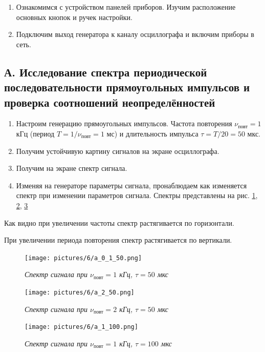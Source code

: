 \documentclass[a4paper,12pt]{article}
\begin{document}
\begin{enumerate}
    \item Ознакомимся с устройством панелей приборов. Изучим расположение основных кнопок и ручек настройки.
    \item Подключим выход генератора к каналу осциллографа и включим приборы в сеть.
\end{enumerate}

\subsection*{А. Исследование спектра периодической последовательности прямоугольных импульсов и проверка соотношений неопределённостей}

\begin{enumerate}[resume]
    \item Настроим генерацию прямоугольных импульсов. Частота повторения $\nu_\text{повт} = 1$ кГц (период $T = 1 /\nu_\text{повт} = 1$ мс) и длительность импульса $\tau = T/20 = 50$ мкс.
    \item Получим устойчивую картину сигналов на экране осциллографа.
    \item Получим на экране спектр сигнала. 
    \item Изменяя на генераторе параметры сигнала, пронаблюдаем как изменяется спектр при изменении параметров сигнала. Спектры представлены на рис. \ref{pic:spectr-1}, \ref{pic:spectr-2}, \ref{pic:spectr-3}
\end{enumerate}

Как видно при увеличении частоты спектр растягивается по горизонтали.

При увеличении периода повторения спектр растягивается по вертикали.

\begin{figure}[!ht]
        \centering
	\texttt{[image: pictures/6/a\_0\_1\_50.png]}
	\caption{\textit{Спектр сигнала при $\nu_\text{повт} = 1$ кГц, $\tau = 50$ мкс}}
	\label{pic:spectr-1}
\end{figure}

\begin{figure}[!ht]
        \centering
	\texttt{[image: pictures/6/a\_2\_50.png]}
	\caption{\textit{Спектр сигнала при $\nu_\text{повт} = 2$ кГц, $\tau = 50$ мкс}}
	\label{pic:spectr-2}
\end{figure}

\begin{figure}[h]
        \centering
	\texttt{[image: pictures/6/a\_1\_100.png]}
	\caption{\textit{Спектр сигнала при $\nu_\text{повт} = 1$ кГц, $\tau = 100$ мкс}}
	\label{pic:spectr-3}
\end{figure}
\end{document}
